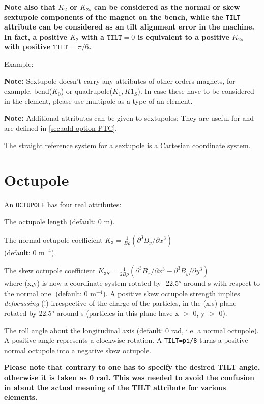 \textbf{Note also that $K_2$ or $K_{2s}$ can be considered as the normal
  or skew sextupole components of the magnet on the bench, while the
  \texttt{TILT} attribute can be considered as an tilt alignment error in the
  machine. In fact, a positive $K_2$ with a $\mathtt{TILT} = 0$ is equivalent to a
  positive $K_{2s}$ with positive $\mathtt{TILT} = \pi/6$.}

Example:

\textbf{Note:} Sextupole doesn't carry any attributes of other orders magnets,
for example, bend($K_0$) or quadrupole($K_1, K1_S$). In case these have to be
considered in the element, please use multipole as a type of an element.


\textbf{Note:} Additional attributes can be given to sextupoles; They
are useful for \ptc and are defined in \ref{sec:add-option-PTC}.

The \hyperref[subsec:local-straight]{straight reference system} for a
sextupole is a Cartesian coordinate system.


\section{Octupole}
\label{sec:octupole}


An \texttt{OCTUPOLE} has four real attributes:
\begin{madlist}
    The octupole length (default: 0 m).

    The normal octupole coefficient
     $K_3 = \frac{1}{B \rho} (\partial^3B_y / \partial x^3)$ \\
     (default:  0 m$^{-4}$).

    The skew octupole coefficient
     $K_{3S} = \frac{1}{2 B\rho} (\partial^3B_x/\partial x^3 -
   \partial^3B_y/\partial y^3)$ \\
     where (x,y) is now a coordinate system rotated by -22.5$^o$ around
     s with respect to the normal one. (default: 0 m$^{-4}$). A positive
     skew octupole strength implies \textsl{defocussing} (!)
     irrespective of the charge of the particles,
     in the (x,s) plane rotated by 22.5$^o$ around s
     (particles in this plane have x $>$ 0, y $>$ 0).

    The roll angle about the longitudinal axis (default: 0
     rad, i.e. a normal octupole). A positive angle represents a
     clockwise rotation. A \texttt{TILT=pi/8} turns a positive normal octupole
     into a negative skew octupole.

     \textbf{Please note that contrary to \madeight one has to specify the
       desired TILT angle, otherwise it is taken as 0 rad. This was
       needed to avoid the confusion in \madeight about the actual meaning of
       the TILT attribute for various elements. }

\end{madlist}

